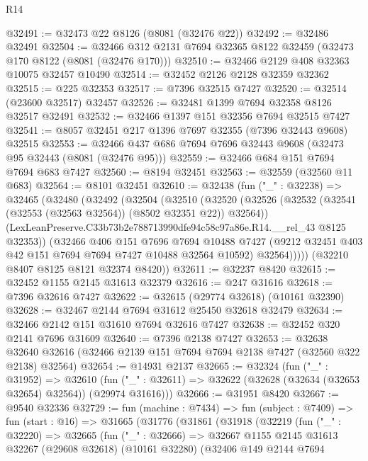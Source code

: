 \begin{lexlean}{R14}
\begin{coremodule}
@32491 := @32473 @22 @8126 (@8081 (@32476 @22))
@32492 := @32486 @32491
@32504 := @32466 @312 @2131 @7694 @32365 @8122 @32459 (@32473 @170 @8122 (@8081 (@32476 @170)))
@32510 := @32466 @2129 @408 @32363 @10075 @32457 @10490
@32514 := @32452 @2126 @2128 @32359 @32362
@32515 := @225 @32353
@32517 := @7396 @32515 @7427
@32520 := @32514 (@23600 @32517) @32457
@32526 := @32481 @1399 @7694 @32358 @8126 @32517 @32491
@32532 := @32466 @1397 @151 @32356 @7694 @32515 @7427
@32541 := @8057 @32451 @217 @1396 @7697 @32355 (@7396 @32443 @9608) @32515
@32553 := @32466 @437 @686 @7694 @7696 @32443 @9608 (@32473 @95 @32443 (@8081 (@32476 @95)))
@32559 := @32466 @684 @151 @7694 @7694 @683 @7427
@32560 := @8194 @32451
@32563 := @32559 (@32560 @11 @683)
@32564 := @8101 @32451
@32610 := @32438
    (fun ("_" : @32238) =>
    @32465
      (@32480
        (@32492
          (@32504
            (@32510
              (@32520
                (@32526 (@32532 (@32541 (@32553 (@32563 @32564)) (@8502 @32351 @22)) @32564))
                (LexLeanPreserve.C33b73b2e788713990dfe94c58c97a86e.R14.__rel_43 @8125 @32353))
              (@32466
                @406
                @151
                @7696
                @7694
                @10488
                @7427
                (@9212 @32451 @403 @42 @151 @7694 @7694 @7427 @10488 @32564 @10592)
                @32564)))))
      (@32210 @8407 @8125 @8121 @32374 @8420))
@32611 := @32237 @8420
@32615 := @32452 @1155 @2145 @31613 @32379
@32616 := @247 @31616
@32618 := @7396 @32616 @7427
@32622 := @32615 (@29774 @32618) (@10161 @32390)
@32628 := @32467 @2144 @7694 @31612 @25450 @32618 @32479
@32634 := @32466 @2142 @151 @31610 @7694 @32616 @7427
@32638 := @32452 @320 @2141 @7696 @31609
@32640 := @7396 @2138 @7427
@32653 := @32638
    @32640
    @32616
    (@32466 @2139 @151 @7694 @7694 @2138 @7427 (@32560 @322 @2138) @32564)
@32654 := @14931 @2137
@32665 := @32324
    (fun ("_" : @31952) =>
    @32610 (fun ("_" : @32611) => @32622 (@32628 (@32634 (@32653 @32654) @32564)) (@29974 @31616)))
@32666 := @31951 @8420
@32667 := @9540 @32336
@32729 := fun (machine : @7434) =>
  fun (subject : @7409) =>
  fun (start : @16) =>
  @31665
    (@31776
      (@31861
        (@31918
          (@32219
            (fun ("_" : @32220) =>
            @32665
              (fun ("_" : @32666) =>
              @32667
                @1155
                @2145
                @31613
                @32267
                (@29608 @32618)
                (@10161 @32280)
                (@32406
                  @149
                  @2144
                  @7694

\end{coremodule}
\end{lexlean}
